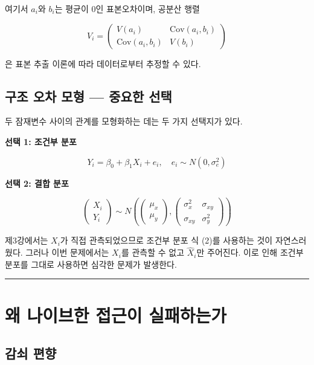 \documentclass[
  letterpaper,
  DIV=11,
  numbers=noendperiod]{scrreprt}
\begin{document}
여기서 \(a_i\)와 \(b_i\)는 평균이 0인 표본오차이며, 공분산 행렬

\[V_i = \begin{pmatrix} V(a_i) & \text{Cov}(a_i, b_i) \\ \text{Cov}(a_i, b_i) & V(b_i) \end{pmatrix}\]

은 표본 추출 이론에 따라 데이터로부터 추정할 수 있다.

\subsection{구조 오차 모형 --- 중요한
선택}\label{uxad6cuxc870-uxc624uxcc28-uxbaa8uxd615-uxc911uxc694uxd55c-uxc120uxd0dd}

두 잠재변수 사이의 관계를 모형화하는 데는 두 가지 선택지가 있다.

\textbf{선택 1: 조건부 분포}

\[Y_i = \beta_0 + \beta_1 X_i + e_i, \quad e_i \sim N(0, \sigma_e^2) \tag{2}\]

\textbf{선택 2: 결합 분포}

\[\begin{pmatrix} X_i \\ Y_i \end{pmatrix} \sim N\left( \begin{pmatrix} \mu_x \\ \mu_y \end{pmatrix}, \begin{pmatrix} \sigma_x^2 & \sigma_{xy} \\ \sigma_{xy} & \sigma_y^2 \end{pmatrix} \right) \tag{3}\]

제3강에서는 \(X_i\)가 직접 관측되었으므로 조건부 분포 식 (2)를 사용하는
것이 자연스러웠다. 그러나 이번 문제에서는 \(X_i\)를 관측할 수 없고
\(\hat{X}_i\)만 주어진다. 이로 인해 조건부 분포를 그대로 사용하면 심각한
문제가 발생한다.

\begin{center}\rule{0.5\linewidth}{0.5pt}\end{center}

\section{왜 나이브한 접근이
실패하는가}\label{uxc65c-uxb098uxc774uxbe0cuxd55c-uxc811uxadfcuxc774-uxc2e4uxd328uxd558uxb294uxac00}

\subsection{감쇠 편향}\label{uxac10uxc1e0-uxd3b8uxd5a5}
\end{document}
